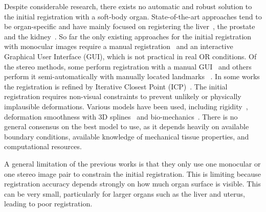 Despite considerable research, there exists no automatic and robust solution to the initial registration with a soft-body organ. State-of-the-art approaches tend to be organ-specific and have mainly focused on registering the liver~\cite{haouchine13,haouchine:hal-01186011,plantefeve:hal-01205194,Robu2018,Reichard2017}, the prostate~\cite{Cohen2010Prostate} and the kidney~\cite{Su2009,nosrati2014simultaneous,affineTracking}.
So far the only existing approaches for the initial registration with monocular images require a manual registration~\cite{affineTracking} and an interactive Graphical User Interface (GUI), which is not practical in real OR conditions.
Of the stereo methods, some perform registration with a manual GUI~\cite{Cohen2010Prostate,haouchine13} and others perform it semi-automatically with manually located landmarks~\cite{21142942,conf/miccai/Amir-KhaliliNPHA13,hamarneh2014igrs,Su2009} .
In some works the registration is refined by Iterative Closest Point (ICP)~\cite{hamarneh2014igrs,Su2009}. %
The initial registration requires non-visual constraints to prevent unlikely or physically implausible deformations. Various models have been used, including rigidity~\cite{Su2009}, deformation smoothness with 3D splines~\cite{conf/miccai/Amir-KhaliliNPHA13} and bio-mechanics~\cite{hamarneh2014igrs,haouchine13,Reichard2017}.
There is no general consensus on the best model to use, as it depends heavily on available boundary conditions, available knowledge of mechanical tissue properties, and computational resources.

A general limitation of the previous works is that they only use one monocular or one stereo image pair to constrain the initial registration.
This is limiting because registration accuracy depends strongly on how much organ surface is visible. 
This can be very small, particularly for larger organs such as the liver and uterus, leading to poor registration.


